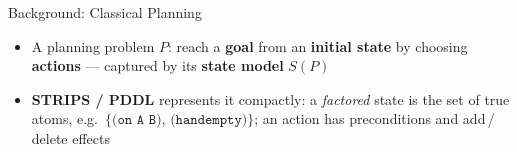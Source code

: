 \documentclass[aspectratio=169, 11pt]{beamer}
\begin{document}
\begin{frame}{Background: Classical Planning}
  \begin{itemize}[<+->]
    \item A planning problem $P$: reach a \textbf{goal} from an \textbf{initial
          state} by choosing \textbf{actions} --- captured by its \textbf{state
          model} $S(P)$
  \end{itemize}
  {\footnotesize
   \par\smallskip}
  \begin{itemize}[<+->]
    \item \textbf{STRIPS / PDDL} represents it compactly: a \emph{factored} state
          is the set of true atoms, e.g.\
          $\{\texttt{(on A B)},\,\texttt{(handempty)}\}$; an action has
          preconditions and add\,/\,delete effects
  \end{itemize}
\end{frame}
\end{document}
